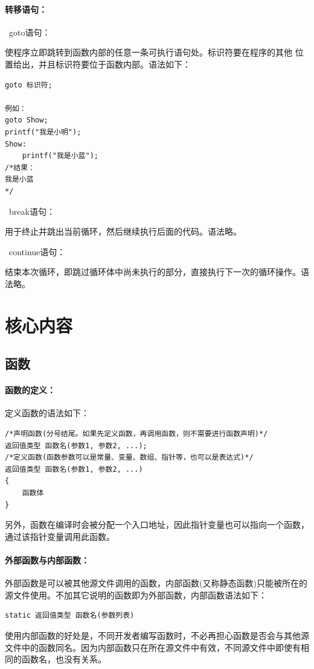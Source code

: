 \documentclass[zihao=-4,UTF8]{report}
\begin{document}
\subsubsection{转移语句：}
\ goto语句：\par
使程序立即跳转到函数内部的任意一条可执行语句处。标识符要在程序的其他
位置给出，并且标识符要位于函数内部。语法如下：
\begin{lstlisting}
goto 标识符;

例如：
goto Show;
printf("我是小明");
Show:
    printf("我是小蓝");
/*结果：
我是小蓝
*/
\end{lstlisting}\par

\ break语句：\par
用于终止并跳出当前循环，然后继续执行后面的代码。语法略。\par
{}\ continue语句：\par
结束本次循环，即跳过循环体中尚未执行的部分，直接执行下一次的循环操作。语法略。

\chapter{核心内容}

\section{函数}
\subsubsection{函数的定义：}
定义函数的语法如下：
\begin{lstlisting}
/*声明函数(分号结尾。如果先定义函数，再调用函数，则不需要进行函数声明)*/
返回值类型 函数名(参数1, 参数2, ...); 
/*定义函数(函数参数可以是常量、变量、数组、指针等，也可以是表达式)*/
返回值类型 函数名(参数1, 参数2, ...)   
{
    函数体
}
\end{lstlisting}
另外，函数在编译时会被分配一个入口地址，因此指针变量也可以指向一个函数，通过该指针变量调用此函数。\par
\subsubsection{外部函数与内部函数：}
外部函数是可以被其他源文件调用的函数，内部函数(又称静态函数)只能被所在的源文件使用。不加其它说明的函数即为外部函数，内部函数语法如下：
\begin{lstlisting}
static 返回值类型 函数名(参数列表)
\end{lstlisting}
{\color{gray}\small 使用内部函数的好处是，不同开发者编写函数时，不必再担心函数是否会与其他源文件中的函数同名。因为内部函数只在所在源文件中有效，不同源文件中即使有相同的函数名，也没有关系。}
\end{document}
